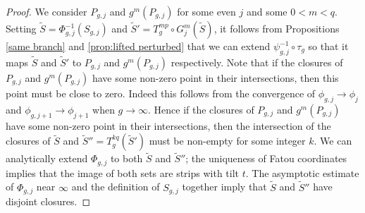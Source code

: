 \documentclass[12pt,letterpaper]{amsart}
\numberwithin{equation}{section}
\theoremstyle{remark}
\theoremstyle{definition}
\newcommand{\Z}{\mathbb Z}
\newcommand{\QQ}{\mathcal Q}
\begin{document}
\begin{proof}
	We consider  $P_{g, j}$ and $g^m(P_{g, j})$ for some even $j$ and  some $0< m< q$. 
	Setting $\tilde S = \Phi_{g, j}^{-1}(S_{g,j})$ and $\tilde{S}' = T_g^{mp}\circ G^m_j(\tilde{S})$,
	it follows from Propositions \ref{same branch} and \ref{prop:lifted perturbed} that we can extend $\psi_{g, j}^{-1}\circ \tau_g$ so that it maps $\tilde{S}$ and $\tilde{S}'$ to 
	$P_{g, j}$ and $g^m(P_{g, j})$ respectively. 
	Note that if the closures of $P_{g, j}$ and $g^m(P_{g, j})$ have some non-zero point in their intersections, then this point must be close to zero. Indeed this follows from the convergence of $\phi_{g, j}\to \phi_j$ and $\phi_{g, j+1}\to \phi_{j+1}$ when $g\to \infty$. Hence if the closures of $P_{g, j}$ and $g^m(P_{g, j})$ have some non-zero point in their intersections, then the intersection of the closures of $\tilde{S}$ and $\tilde{S}''= T_g^{kq}(\tilde{S}')$ must be non-empty for some integer $k$. We can analytically extend $\Phi_{g, j}$ to both $\tilde{S}$ and $\tilde{S}''$; the uniqueness of Fatou coordinates implies that the image of both sets are strips with tilt $t$. The asymptotic estimate of $\Phi_{g, j}$ near $\infty$ and the definition of $S_{g, j}$ together imply that $\tilde{S}$ and $\tilde{S}''$ have disjoint closures.
%	
%	
%	
%	
%	
%	
%	
%	
%	
%	

\end{proof}
\end{document}
